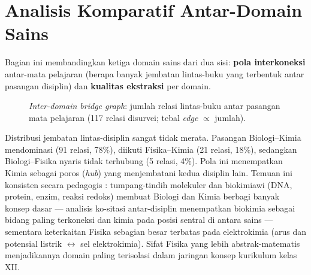 \documentclass[main]{subfiles}
\begin{document}
\section{Analisis Komparatif Antar-Domain Sains}\label{subsec:komparatif}

Bagian ini membandingkan ketiga domain sains dari dua sisi: \textbf{pola
interkoneksi} antar-mata pelajaran (berapa banyak jembatan lintas-buku
yang terbentuk antar pasangan disiplin) dan \textbf{kualitas ekstraksi}
per domain.

\begin{figure}[htbp]
  \centering
  \caption{\textit{Inter-domain bridge graph}: jumlah relasi lintas-buku antar
    pasangan mata pelajaran (117 relasi disurvei; tebal \textit{edge} $\propto$ jumlah).}
  \label{fig:bridge-graph}
\end{figure}

Distribusi jembatan lintas-disiplin sangat tidak merata. Pasangan
Biologi--Kimia mendominasi (91 relasi, 78\%), diikuti Fisika--Kimia (21
relasi, 18\%), sedangkan Biologi--Fisika nyaris tidak terhubung (5
relasi, 4\%). Pola ini menempatkan Kimia sebagai poros (\textit{hub}) yang
menjembatani kedua disiplin lain. Temuan ini konsisten secara pedagogis
\parencite{dyachenko_integration_2024}: tumpang-tindih molekuler dan
biokimiawi (DNA, protein, enzim, reaksi redoks) membuat Biologi dan Kimia
berbagi banyak konsep dasar --- analisis ko-sitasi antar-disiplin
menempatkan biokimia sebagai bidang paling terkoneksi dan kimia pada posisi
sentral di antara sains \parencite{balaban_central_2006} --- sementara
keterkaitan Fisika sebagian besar terbatas pada elektrokimia (arus dan
potensial listrik $\leftrightarrow$ sel elektrokimia). Sifat Fisika yang lebih
abstrak-matematis menjadikannya domain paling terisolasi dalam jaringan
konsep kurikulum kelas XII.
\end{document}
